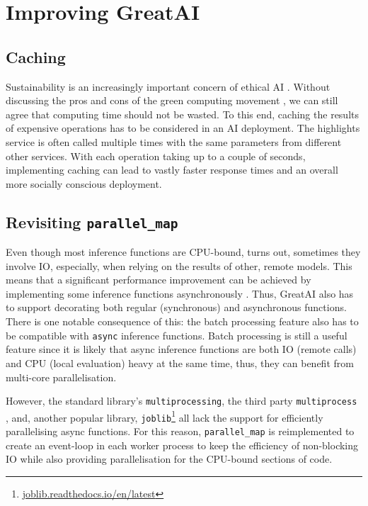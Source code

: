 \section{Improving GreatAI}

\subsection{Caching}

Sustainability is an increasingly important concern of ethical AI \cite{van2021sustainable}. Without discussing the pros and cons of the green computing movement \cite{10.1145/1400181.1400186}, we can still agree that computing time should not be wasted. To this end, caching the results of expensive operations has to be considered in an AI deployment. The highlights service is often called multiple times with the same parameters from different other services. With each operation taking up to a couple of seconds, implementing caching can lead to vastly faster response times and an overall more socially conscious deployment.

\subsection{Revisiting \texttt{parallel\_map}}

Even though most inference functions are CPU-bound, turns out, sometimes they involve IO, especially, when relying on the results of other, remote models. This means that a significant performance improvement can be achieved by implementing some inference functions asynchronously \cite{tilkov2010node}. Thus, GreatAI also has to support decorating both regular (synchronous) and asynchronous functions. There is one notable consequence of this: the batch processing feature also has to be compatible with \texttt{async} inference functions. Batch processing is still a useful feature since it is likely that async inference functions are both IO (remote calls) and CPU (local evaluation) heavy at the same time, thus, they can benefit from multi-core parallelisation. 

However, the standard library's \texttt{multiprocessing}, the third party \texttt{multiprocess} \cite{mckerns2012building}, and, another popular library, \texttt{joblib}\footnote{\href{https://joblib.readthedocs.io/en/latest/}{joblib.readthedocs.io/en/latest}} all lack the support for efficiently parallelising async functions. For this reason, \texttt{parallel\_map} is reimplemented to create an event-loop in each worker process to keep the efficiency of non-blocking IO while also providing parallelisation for the CPU-bound sections of code.

